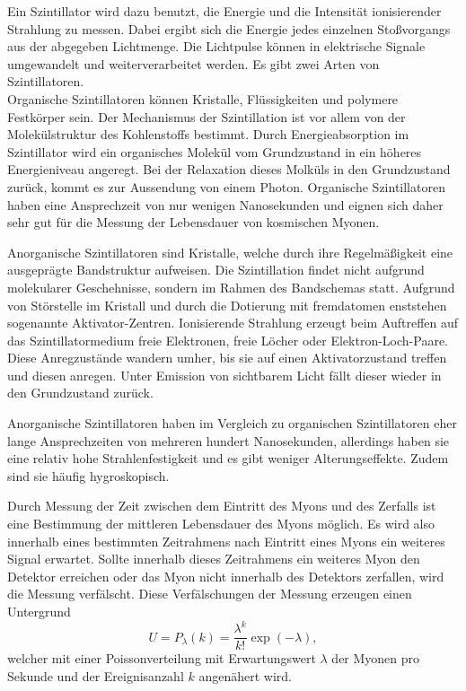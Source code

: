 Ein Szintillator wird dazu benutzt, die Energie und die Intensität ionisierender Strahlung zu messen. Dabei ergibt sich die Energie 
jedes einzelnen Stoßvorgangs aus der abgegeben Lichtmenge.
Die Lichtpulse können in elektrische Signale umgewandelt und weiterverarbeitet werden.
Es gibt zwei Arten von Szintillatoren.\\


Organische Szintillatoren können Kristalle, Flüssigkeiten und polymere Festkörper sein. 
Der Mechanismus der Szintillation ist vor allem von der Molekülstruktur des Kohlenstoffs bestimmt.
Durch Energieabsorption im Szintillator wird ein organisches Molekül vom Grundzustand in ein höheres Energieniveau angeregt.
Bei der Relaxation dieses Molküls in den Grundzustand zurück, kommt es zur Aussendung von einem Photon.
Organische Szintillatoren haben eine Ansprechzeit von nur wenigen Nanosekunden und eignen sich daher sehr gut für die Messung der Lebensdauer
von kosmischen Myonen.

Anorganische Szintillatoren sind Kristalle, welche durch ihre Regelmäßigkeit eine ausgeprägte Bandstruktur aufweisen.
Die Szintillation findet nicht aufgrund molekularer Geschehnisse, sondern im Rahmen des Bandschemas statt.
Aufgrund von Störstelle im Kristall und durch die Dotierung mit fremdatomen enststehen sogenannte Aktivator-Zentren.
Ionisierende Strahlung erzeugt beim Auftreffen auf das Szintillatormedium freie 
Elektronen, freie Löcher oder Elektron-Loch-Paare. Diese Anregzustände wandern umher, bis sie auf einen Aktivatorzustand treffen und diesen
anregen. Unter Emission von sichtbarem Licht fällt dieser wieder in den Grundzustand zurück.

Anorganische Szintillatoren haben im Vergleich zu organischen Szintillatoren eher lange Ansprechzeiten von mehreren hundert Nanosekunden,
allerdings haben sie eine relativ hohe Strahlenfestigkeit und es gibt weniger Alterungseffekte. Zudem sind sie häufig hygroskopisch.

Durch Messung der Zeit zwischen dem Eintritt des Myons und des
Zerfalls ist eine Bestimmung der mittleren Lebensdauer des Myons möglich.
Es wird also innerhalb eines bestimmten Zeitrahmens nach Eintritt eines Myons ein weiteres Signal
erwartet.
Sollte innerhalb dieses Zeitrahmens ein weiteres Myon den Detektor erreichen oder das
Myon nicht innerhalb des Detektors zerfallen, wird die Messung verfälscht.
Diese Verfälschungen der Messung erzeugen einen Untergrund
\begin{equation}
  U = P_{\lambda} (k) = \frac{\lambda^{k}}{k!} \exp{(-\lambda)},
  \label{eqn:Untergrundrate}
\end{equation}
welcher mit einer Poissonverteilung mit Erwartungswert $\lambda$ der Myonen pro Sekunde und der Ereignisanzahl $k$ angenähert wird.

